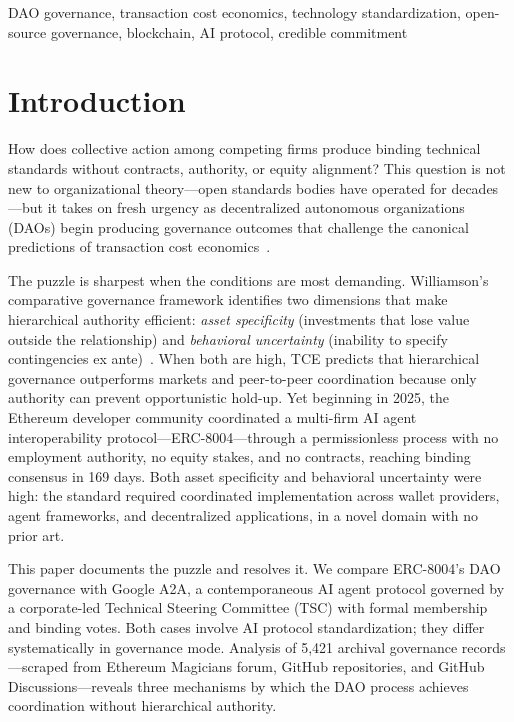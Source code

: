 \documentclass[conference]{IEEEtran}
\begin{document}
\begin{IEEEkeywords}
DAO governance, transaction cost economics, technology standardization,
open-source governance, blockchain, AI protocol, credible commitment
\end{IEEEkeywords}


\section{Introduction}

How does collective action among competing firms produce binding technical
standards without contracts, authority, or equity alignment? This question is
not new to organizational theory---open standards bodies have operated for
decades---but it takes on fresh urgency as decentralized autonomous organizations
(DAOs) begin producing governance outcomes that challenge the canonical
predictions of transaction cost economics~\cite{williamson1985}.

The puzzle is sharpest when the conditions are most demanding. Williamson's
comparative governance framework identifies two dimensions that make hierarchical
authority efficient: \textit{asset specificity} (investments that lose value
outside the relationship) and \textit{behavioral uncertainty} (inability to
specify contingencies ex ante)~\cite{williamson1991}. When both are high, TCE
predicts that hierarchical governance outperforms markets and peer-to-peer
coordination because only authority can prevent opportunistic hold-up. Yet
beginning in 2025, the Ethereum developer community coordinated a multi-firm
AI agent interoperability protocol---ERC-8004---through a permissionless process
with no employment authority, no equity stakes, and no contracts, reaching
binding consensus in 169 days. Both asset specificity and behavioral uncertainty
were high: the standard required coordinated implementation across wallet
providers, agent frameworks, and decentralized applications, in a novel domain
with no prior art.

This paper documents the puzzle and resolves it. We compare ERC-8004's DAO
governance with Google A2A, a contemporaneous AI agent protocol governed by a
corporate-led Technical Steering Committee (TSC) with formal membership and
binding votes. Both cases involve AI protocol standardization; they differ
systematically in governance mode. Analysis of 5,421 archival governance
records---scraped from Ethereum Magicians forum, GitHub repositories, and
GitHub Discussions---reveals three mechanisms by which the DAO process achieves
coordination without hierarchical authority.
\end{document}
